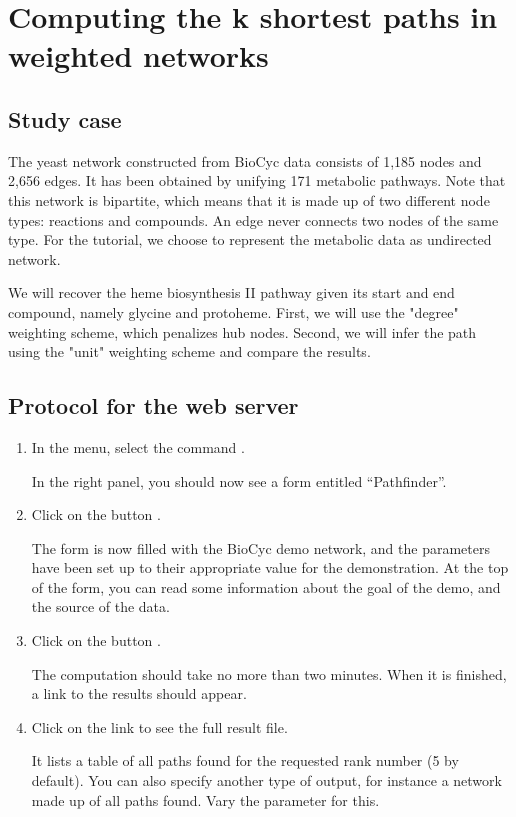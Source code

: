 \section{Computing the k shortest paths in weighted networks}

\subsection{Study case}

The yeast network constructed from BioCyc data consists of 1,185 nodes and 2,656 edges.
It has been obtained by unifying 171 metabolic pathways. Note that this network is bipartite, which means that it is made up of
two different node types: reactions and compounds. An edge never connects two nodes of the same type. For the tutorial, we choose
to represent the metabolic data as undirected network.

We will recover the heme biosynthesis II pathway given its start and end compound, namely glycine and protoheme. First, we will
use the "degree" weighting scheme, which penalizes hub nodes. Second, we will infer the path using the "unit"
weighting scheme and compare the results.

\subsection{Protocol for the web server}

\begin{enumerate}

\item In the \neat  menu, select the command .

  In the right panel, you should now see a form entitled
  ``Pathfinder''.

\item Click on the button .

  The form is now filled with the BioCyc demo network, and the parameters have been
  set up to their appropriate value for the demonstration. At the top
  of the form, you can read some information about the goal of the
  demo, and the source of the data.

\item Click on the button .

  The computation should take no more than two minutes. When it is finished, a link to the results should appear.

\item Click on the link to see the full result file.

  It lists a table of all paths found for the requested rank number (5 by default). You can also specify another type of output, for instance a network made up of all paths found. Vary the parameter  for this.

\end{enumerate}

